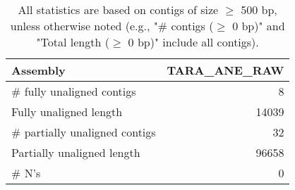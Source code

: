\documentclass[12pt,a4paper]{article}
\begin{document}
\begin{table}[ht]
\begin{center}
\caption{All statistics are based on contigs of size $\geq$ 500 bp, unless otherwise noted (e.g., "\# contigs ($\geq$ 0 bp)" and "Total length ($\geq$ 0 bp)" include all contigs).}
\begin{tabular}{|l*{1}{|r}|}
\hline
Assembly & TARA\_ANE\_RAW \\ \hline
\# fully unaligned contigs & 8 \\ \hline
Fully unaligned length & 14039 \\ \hline
\# partially unaligned contigs & 32 \\ \hline
Partially unaligned length & 96658 \\ \hline
\# N's & 0 \\ \hline
\end{tabular}
\end{center}
\end{table}
\end{document}

